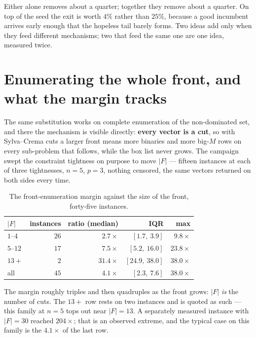 \documentclass[11pt,a4paper]{article}
\begin{document}
\noindent
Either alone removes about a quarter; together they remove about a quarter.  On
top of the seed the exit is worth $4\%$ rather than $25\%$, because a good
incumbent arrives early enough that the hopeless tail barely forms.  Two ideas
add only when they feed different mechanisms; two that feed the same one are
one idea, measured twice.

\section{Enumerating the whole front, and what the margin tracks}

The same substitution works on complete enumeration of the non-dominated set,
and there the mechanism is visible directly: \textbf{every vector is a cut}, so
with Sylva--Crema cuts a larger front means more binaries and more big-$M$
rows on every sub-problem that follows, while the box list never grows.  The campaign
swept the constraint tightness on purpose to move $|F|$ --- fifteen instances
at each of three tightnesses, $n=5$, $p=3$, nothing censored, the same vectors
returned on both sides every time.

\begin{table}[h]
\centering
\caption{The front-enumeration margin against the size of the front, forty-five
instances.}
\begin{tabular}{lrrrr}
\toprule
$|F|$ & instances & ratio (median) & IQR & max \\
\midrule
$1$--$4$  & $26$ & $2.7\times$  & $[1.7,\ 3.9]$   & $9.8\times$ \\
$5$--$12$ & $17$ & $7.5\times$  & $[5.2,\ 16.0]$  & $23.8\times$ \\
$13+$     & $2$  & $31.4\times$ & $[24.9,\ 38.0]$ & $38.0\times$ \\
\midrule
all       & $45$ & $4.1\times$  & $[2.3,\ 7.6]$   & $38.0\times$ \\
\bottomrule
\end{tabular}
\end{table}

\begin{center}
\end{center}

\noindent
The margin roughly triples and then quadruples as the front grows: $|F|$
\emph{is} the number of cuts.  The $13+$ row rests on two instances and is
quoted as such --- this family at $n=5$ tops out near $|F|=13$.  A separately
measured instance with $|F| = 30$ reached $204\times$; that is an observed
extreme, and the typical case on this family is the $4.1\times$ of the last
row.
\end{document}
